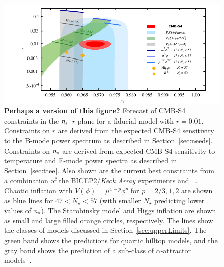 \begin{figure}[ht]
\begin{center}
\includegraphics[width=6in]{figs/nsrlabeledrp01v10s}
\end{center}
\caption{{\bf Perhaps a version of this figure?} Forecast of CMB-S4 constraints in the $n_{\rm s}$--$r$ plane for a fiducial model with $r=0.01$. Constraints 
on $r$ are derived from the expected CMB-S4 sensitivity to the B-mode power spectrum as described in 
Section~\ref{sec:needs}. Constraints on $n_{\rm s}$ are derived from expected CMB-S4 sensitivity to temperature and 
E-mode power spectra as described in Section~\ref{sec:ttee}. Also shown are the current best constraints from a combination of the { BICEP}2/{\em Keck Array} experiments and \planck\ \cite{Array:2015xqh}. Chaotic inflation with $V(\phi)=\mu^{4-p}\phi^p$ for \mbox{$p=2/3,1,2$} are shown as blue lines for $47<N_\star<57$ (with smaller $N_\star$ predicting lower values of $n_{\rm s}$). The Starobinsky model and Higgs inflation are shown as small and large filled orange circles, respectively. The lines show the classes of models discussed in Section~\ref{sec:upperLimits}. The green band shows the predictions for quartic hilltop models, and the gray band shows the prediction of a sub-class of $\alpha$-attractor models~\cite{Kallosh:2013hoa}.
}
\label{fig:nsrp01}
\end{figure}


